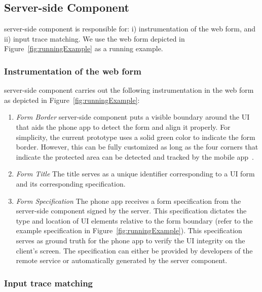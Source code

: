 \subsection{Server-side Component}
\label{sec:systemDesign:webserver}

\name server-side component is responsible for: i) instrumentation of the web form, and ii) input trace matching. We use the web form depicted in Figure~\ref{fig:runningExample} as a running example.

\subsubsection{Instrumentation of the web form}
\label{sec:systemDesign:webserver:instr}

\name server-side component carries out the following instrumentation in the web form as depicted in Figure~\ref{fig:runningExample}:

\begin{enumerate}	

\item[\one] \emph{Form Border} \sysname server-side component puts a visible boundary around the UI that aids the \sysname phone app to detect the form and align it properly. For simplicity, the current prototype uses a solid green color to indicate the form border.
However, this can be fully customized as long as the four corners that indicate the protected area can be detected and tracked by the mobile app~\cite{zhang2002visual}.



\item[\two] \emph{Form Title} The title serves as a unique identifier corresponding to a UI form and its corresponding specification.

\item[\three] \emph{Form Specification} The \sysname phone app receives a form specification from the server-side component signed by the server. This specification dictates the type and location of UI elements relative to the form boundary (refer to the example specification in Figure~\ref{fig:runningExample}). This specification serves as ground truth for the phone app to verify the UI integrity on the client's screen. The specification can either be provided by developers of the remote service or automatically generated by the \sysname server component.

\end{enumerate}

\subsubsection{Input trace matching}

